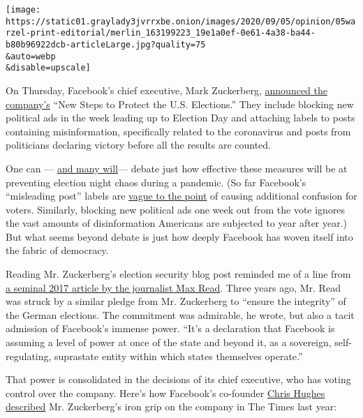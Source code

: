 \texttt{[image: https://static01.graylady3jvrrxbe.onion/images/2020/09/05/opinion/05warzel-print-editorial/merlin\_163199223\_19e1a0ef-0e61-4a38-ba44-b80b96922dcb-articleLarge.jpg?quality=75\\\&auto=webp\\\&disable=upscale]}

On Thursday, Facebook's chief executive, Mark Zuckerberg,
\href{https://www.nytimes3xbfgragh.onion/2020/09/03/technology/facebook-election-chaos-november.html}{announced
the company's} ``New Steps to Protect the U.S. Elections.'' They include
blocking new political ads in the week leading up to Election Day and
attaching labels to posts containing misinformation, specifically
related to the coronavirus and posts from politicians declaring victory
before all the results are counted.

One can ---
\href{https://www.washingtonpost.com/politics/2020/09/03/facebook-made-change-that-could-help-control-election-misinformation-it-isnt-ban-ads/}{and
many will}--- debate just how effective these measures will be at
preventing election night chaos during a pandemic. (So far Facebook's
``misleading post'' labels are
\href{https://twitter.com/sheeraf/status/1301539720199979013}{vague to
the point} of causing additional confusion for voters. Similarly,
blocking new political ads one week out from the vote ignores the vast
amounts of disinformation Americans are subjected to year after year.)
But what seems beyond debate is just how deeply Facebook has woven
itself into the fabric of democracy.

Reading Mr. Zuckerberg's election security blog post reminded me of a
line from
\href{https://nymag.com/intelligencer/2017/10/does-even-mark-zuckerberg-know-what-facebook-is.html}{a
seminal 2017 article by the journalist Max Read}. Three years ago, Mr.
Read was struck by a similar pledge from Mr. Zuckerberg to ``ensure the
integrity'' of the German elections. The commitment was admirable, he
wrote, but also a tacit admission of Facebook's immense power. ``It's a
declaration that Facebook is assuming a level of power at once of the
state and beyond it, as a sovereign, self-regulating, suprastate entity
within which states themselves operate.''

That power is consolidated in the decisions of its chief executive, who
has voting control over the company. Here's how Facebook's co-founder
\href{https://www.nytimes3xbfgragh.onion/2019/05/09/opinion/sunday/chris-hughes-facebook-zuckerberg.html}{Chris
Hughes described} Mr. Zuckerberg's iron grip on the company in The Times
last year:

